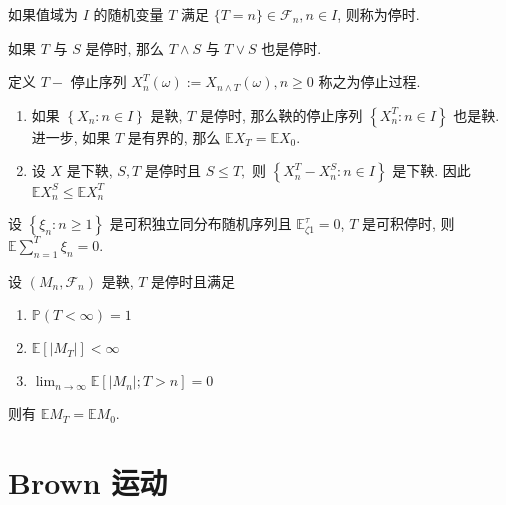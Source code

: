 \documentclass[10pt]{yerbaformat}
\begin{document}
\begin{definition}
    如果值域为 $I$ 的随机变量 $T$ 满足 $\{T=n\} \in \mathcal{F}_{n}, n \in I$, 则称为停时.
\end{definition}

\begin{lemma}
    如果 $T$ 与 $S$ 是停时, 那么 $T \wedge S$ 与 $T \vee S$ 也是停时.
\end{lemma}

\begin{definition}[停止过程]
    定义 $T-$ 停止序列 $X_{n}^{T}(\omega):=X_{n \wedge T}(\omega), n \geq 0$ 称之为停止过程.
\end{definition}

\begin{theorem}[有界停止定理]
    \begin{enumerate}
        \item 如果 $\left\{X_{n}: n \in I\right\}$ 是鞅, $T$ 是停时, 那么鞅的停止序列 $\left\{X_{n}^{T}: n \in I\right\}$ 也是鞅. 进一步, 如果 $T$ 是有界的, 那么 $\mathbb{E} X_{T}=\mathbb{E} X_{0}$.
        \item 设 $X$ 是下鞅, $S, T$ 是停时且 $S \leq T,$ 则 $\left\{X_{n}^{T}-X_{n}^{S}: n \in I\right\}$ 是下鞅. 因此 $\mathbb{E} X_{n}^{S} \leq \mathbb{E} X_{n}^{T}$
    \end{enumerate}
\end{theorem}

\begin{theorem}[Wald 等式]
    设 $\left\{\xi_{n}: n \geq 1\right\}$ 是可积独立同分布随机序列且 $\mathbb{E}_{\zeta 1}^{\tau}=0$, $T$ 是可积停时, 则 $\mathbb{E} \sum_{n=1}^{T} \xi_{n}=0 .$
\end{theorem}

\begin{theorem}[停止定理]
    设 $\left(M_{n}, \mathcal{F}_{n}\right)$ 是鞅, $T$ 是停时且满足
    \begin{enumerate}
        \item $\mathbb{P}(T<\infty)=1$
        \item $\mathbb{E}\left[\left|M_{T}\right|\right]<\infty$
        \item $\lim _{n \rightarrow \infty} \mathbb{E}\left[\left|M_{n}\right| ; T>n\right]=0$
    \end{enumerate}
    则有 $\mathbb{E} M_{T}=\mathbb{E} M_{0}$.
\end{theorem}

\section{Brown 运动}
\end{document}

